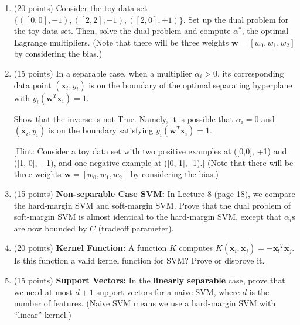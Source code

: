 \documentclass[11pt]{article}
\begin{document}
\begin{enumerate}

\item (20 points) Consider the toy data set $\{([0, 0], -1),
([2, 2], -1), ([2, 0], +1)\}$. Set up the dual problem for
the toy data set. Then, solve the dual problem and compute
$\alpha^*$, the optimal Lagrange multipliers. (Note that there will
be three weights $\boldsymbol w = [w_0, w_1, w_2]$ by considering
the bias.)

\item (15 points) In a separable case, when a multiplier
$\alpha_i > 0$, its corresponding data point $(\boldsymbol x_i,
y_i)$ is on the boundary of the optimal separating hyperplane
with $y_i(\boldsymbol w^T \boldsymbol x_i) = 1$.

Show that the inverse is not True. Namely, it is possible that
$\alpha_i = 0$ and $(\boldsymbol x_i, y_i)$ is on the boundary
satisfying $y_i(\boldsymbol w^T \boldsymbol x_i) = 1$.

[Hint: Consider a toy data set with two positive examples at
([0,0], +1) and ([1, 0], +1), and one negative example at ([0,
1], -1).] (Note that there will be three weights $\boldsymbol w =
[w_0, w_1, w_2]$ by considering the bias.)

\item (15 points) \textbf{Non-separable Case SVM:} In Lecture 8
(page 18), we compare the hard-margin SVM and soft-margin SVM.
Prove that the dual problem of soft-margin SVM is almost
identical to the hard-margin SVM, except that $\alpha_i$s are
now bounded by $C$ (tradeoff parameter).

\item (20 points) \textbf{Kernel Function:} A function $K$
computes $K(\boldsymbol x_i, \boldsymbol x_j) =
-\boldsymbol{x_i}^T \boldsymbol x_j $. Is this function a valid
kernel function for SVM? Prove or disprove it.

\item (15 points) \textbf{Support Vectors:} In the
\textbf{linearly separable} case, prove that we need at most
$d+1$ support vectors for a naive SVM, where $d$ is the number of
features. (Naive SVM means we use a hard-margin SVM with
``linear'' kernel.)


\end{enumerate}
\end{document}
